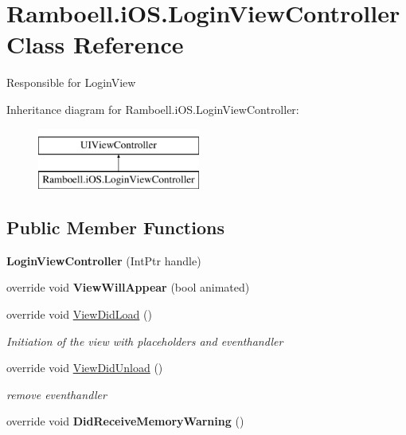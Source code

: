 \hypertarget{class_ramboell_1_1i_o_s_1_1_login_view_controller}{}\section{Ramboell.\+i\+O\+S.\+Login\+View\+Controller Class Reference}
\label{class_ramboell_1_1i_o_s_1_1_login_view_controller}


Responsible for Login\+View  


Inheritance diagram for Ramboell.\+i\+O\+S.\+Login\+View\+Controller\+:\begin{figure}[H]
\begin{center}
\leavevmode
\includegraphics[height=2.000000cm]{class_ramboell_1_1i_o_s_1_1_login_view_controller}
\end{center}
\end{figure}
\subsection*{Public Member Functions}
\begin{DoxyCompactItemize}
\item 
\mbox{\label{class_ramboell_1_1i_o_s_1_1_login_view_controller_ad47b0bfc828ac5009b16abe51283a6d6}} 
{\bfseries Login\+View\+Controller} (Int\+Ptr handle)
\item 
\mbox{\label{class_ramboell_1_1i_o_s_1_1_login_view_controller_aad7d3c377988c749c64d85932bdde0a3}} 
override void {\bfseries View\+Will\+Appear} (bool animated)
\item 
override void \hyperlink{class_ramboell_1_1i_o_s_1_1_login_view_controller_a43dbaf2dd54a2a4884ca87d26697f375}{View\+Did\+Load} ()
\begin{DoxyCompactList}\small\item\em Initiation of the view with placeholders and eventhandler \end{DoxyCompactList}\item 
override void \hyperlink{class_ramboell_1_1i_o_s_1_1_login_view_controller_ac6f5b00fbb4861aa7e87e21c25e76c55}{View\+Did\+Unload} ()
\begin{DoxyCompactList}\small\item\em remove eventhandler \end{DoxyCompactList}\item 
\mbox{\label{class_ramboell_1_1i_o_s_1_1_login_view_controller_a33baa98e9632062555dc7cc43d3f6d1a}} 
override void {\bfseries Did\+Receive\+Memory\+Warning} ()
\end{DoxyCompactItemize}
